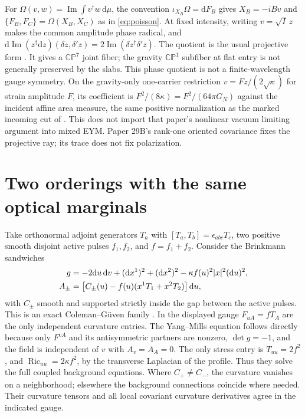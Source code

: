 \documentclass[11pt]{article}
\newcommand{\dd}{\mathrm d}
\newcommand{\im}{\operatorname{Im}}
\begin{document}
For \(\Omega(v,w)=\im\int v^\dagger w\,\dd\mu\), the
convention \(\iota_{X_B}\Omega=\dd F_B\) gives
\(X_B=-iBv\) and \(\{F_B,F_C\}=\Omega(X_B,X_C)\)
as in \eqref{eq:poisson}. At fixed intensity, writing
\(v=\sqrt I\,z\) makes the common amplitude phase radical,
and \( \dd\im(z^\dagger\dd z)(\delta z,\delta' z)
=2\im(\delta z^\dagger\delta' z)\).
The quotient is the usual projective form \cite{ashtekar}.
It gives a \(\mathbb{CP}^7\) joint fiber; the gravity
\(\mathbb{CP}^1\) subfiber at flat entry is not generally
preserved by the slabs. This phase quotient is not
a finite-wavelength gauge symmetry. On the gravity-only
one-carrier restriction \(v=Fz/(2\sqrt\kappa)\) for strain
amplitude \(F\), its coefficient is
\(F^2/(8\kappa)=F^2/(64\pi G_N)\) against the incident
affine area measure, the same positive normalization
as the marked incoming cut of \cite{p29c}. This does
not import that paper's nonlinear vacuum limiting
argument into mixed EYM. Paper 29B's rank-one
oriented covariance fixes the projective ray; its trace
does not fix polarization.

\section{Two orderings with the same optical marginals}\label{sec:bg}

Take orthonormal adjoint generators \(T_a\) with
\([T_a,T_b]=\epsilon_{abc}T_c\), two positive smooth
disjoint active pulses \(f_1,f_2\), and \(f=f_1+f_2\).
Consider the Brinkmann sandwiches
\begin{align}
 g&=-2\dd u\,\dd v+(\dd x^1)^2+(\dd x^2)^2
                     -\kappa f(u)^2|x|^2(\dd u)^2,\notag\\
 A_\pm&=\big[C_\pm(u)-f(u)(x^1T_1+x^2T_2)\big]\,\dd u,
 \label{eq:background}
\end{align}
with \(C_\pm\) smooth and supported strictly inside the
gap between the active pulses. This is an exact
Coleman--G\"uven family \cite{coleman,guven,gst,p60}.
In the displayed gauge \(F_{uA}=fT_A\) are the only
independent curvature entries. The Yang--Mills equation
follows directly because only \(F^{vA}\) and its
antisymmetric partners are nonzero, \(\det g=-1\),
and the field is independent of \(v\) with \(A_v=A_A=0\).
The only stress entry is \(T_{uu}=2f^2\), and
\(\operatorname{Ric}_{uu}=2\kappa f^2\), by the transverse
Laplacian of the profile. Thus they solve the full coupled
background equations. Where \(C_+\ne C_-\), the curvature
vanishes on a neighborhood; elsewhere the background
connections coincide where needed. Their curvature tensors
and all local covariant curvature derivatives agree in
the indicated gauge.
\end{document}
